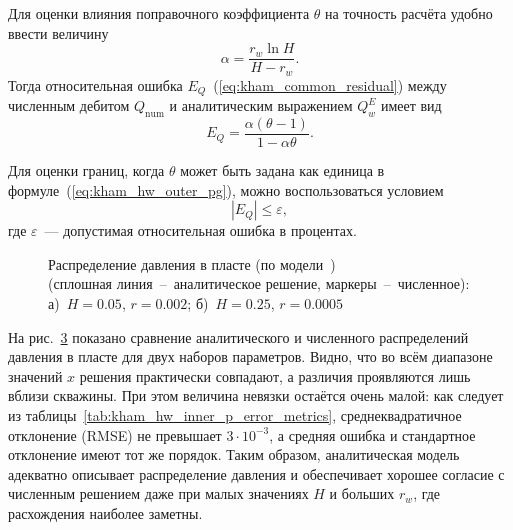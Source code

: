 \documentclass{article}
\begin{document}
Для оценки влияния поправочного коэффициента $\theta$ на точность расчёта удобно ввести величину
\begin{equation*}
	\alpha = \frac{r_w \ln H}{H-r_w}.
\end{equation*}
Тогда относительная ошибка $E_Q$~(\ref{eq:kham_common_residual}) между численным дебитом $Q_{\text{num}}$ и аналитическим выражением $Q_w^E$ имеет вид
\begin{equation}
	E_Q = \dfrac{\alpha(\theta-1)}{1-\alpha\theta}.
	\label{eq:kham_theta_error_exact}
\end{equation}

Для оценки границ, когда $\theta$ может быть задана как единица в формуле~(\ref{eq:kham_hw_outer_pg}), можно воспользоваться условием
\begin{equation*}
	|E_Q| \leq \varepsilon,
\end{equation*}
где $\varepsilon$~--- допустимая относительная ошибка в процентах.

\begin{figure}[H]
	\centering
	\begin{subfigure}{0.48\textwidth}
		\centering
		
		\caption{}
		\label{fig:kham_hw_outer_p_worst_pg_mgrp}
	\end{subfigure}
	\hfill
	\begin{subfigure}{0.48\textwidth}
		\centering
		
		\caption{}
		\label{fig:kham_hw_outer_p_best_pg_mgrp}
	\end{subfigure}
	\caption{
		Распределение давления в пласте (по модели~\cite{lit:kham_mazo_uzku_2015}) \\
		(сплошная линия~--~аналитическое решение, маркеры~--~численное): \\
		а)~$H = 0.05$, $r = 0.002$;
		б)~$H = 0.25$, $r = 0.0005$
	}
	\label{fig:kham_hw_outer_press_disrt_mgrp}
\end{figure}

На рис.~\ref{fig:kham_hw_outer_press_disrt_mgrp} показано сравнение аналитического и численного
распределений давления в пласте для двух наборов параметров. Видно, что во всём диапазоне
значений $x$ решения практически совпадают, а различия проявляются лишь вблизи скважины.
При этом величина невязки остаётся очень малой: как следует из таблицы~\ref{tab:kham_hw_inner_p_error_metrics},
среднеквадратичное отклонение (RMSE) не превышает $3 \cdot 10^{-3}$, а средняя ошибка и стандартное отклонение
имеют тот же порядок. Таким образом, аналитическая модель адекватно описывает распределение давления
и обеспечивает хорошее согласие с численным решением даже при малых значениях $H$ и больших $r_w$,
где расхождения наиболее заметны.
\end{document}
